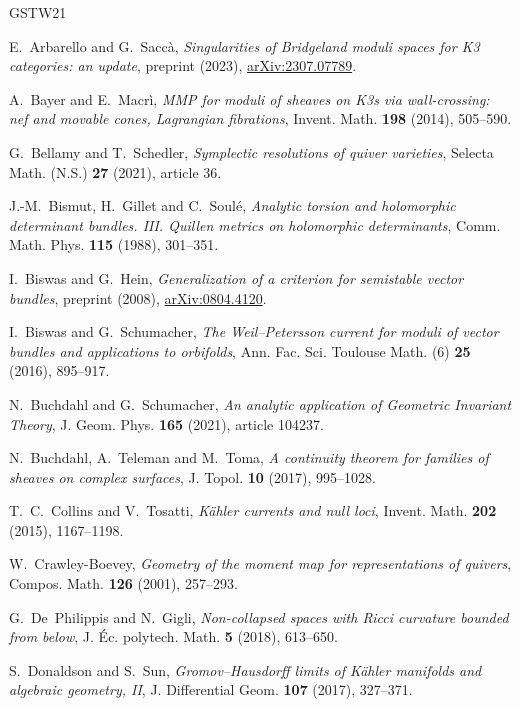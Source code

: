 \begin{thebibliography}{GSTW21}

E.~Arbarello and G.~Sacc\`a,
\emph{Singularities of Bridgeland moduli spaces for K3 categories: an update},
preprint (2023), \href{https://arxiv.org/abs/2307.07789}{arXiv:2307.07789}.

A.~Bayer and E.~Macr\`i,
\emph{MMP for moduli of sheaves on K3s via wall-crossing: nef and movable
cones, Lagrangian fibrations}, Invent. Math. \textbf{198} (2014), 505--590.

G.~Bellamy and T.~Schedler,
\emph{Symplectic resolutions of quiver varieties},
Selecta Math. (N.S.) \textbf{27} (2021), article 36.

J.-M.~Bismut, H.~Gillet and C.~Soul\'e,
\emph{Analytic torsion and holomorphic determinant bundles. III.
Quillen metrics on holomorphic determinants},
Comm. Math. Phys. \textbf{115} (1988), 301--351.

I.~Biswas and G.~Hein,
\emph{Generalization of a criterion for semistable vector bundles},
preprint (2008), \href{https://arxiv.org/abs/0804.4120}{arXiv:0804.4120}.

I.~Biswas and G.~Schumacher,
\emph{The Weil--Petersson current for moduli of vector bundles and
applications to orbifolds}, Ann. Fac. Sci. Toulouse Math. (6)
\textbf{25} (2016), 895--917.

N.~Buchdahl and G.~Schumacher,
\emph{An analytic application of Geometric Invariant Theory},
J. Geom. Phys. \textbf{165} (2021), article 104237.

N.~Buchdahl, A.~Teleman and M.~Toma,
\emph{A continuity theorem for families of sheaves on complex surfaces},
J. Topol. \textbf{10} (2017), 995--1028.

T.~C.~Collins and V.~Tosatti,
\emph{K\"ahler currents and null loci},
Invent. Math. \textbf{202} (2015), 1167--1198.

W.~Crawley-Boevey,
\emph{Geometry of the moment map for representations of quivers},
Compos. Math. \textbf{126} (2001), 257--293.

G.~De~Philippis and N.~Gigli,
\emph{Non-collapsed spaces with Ricci curvature bounded from below},
J. \'Ec. polytech. Math. \textbf{5} (2018), 613--650.

S.~Donaldson and S.~Sun,
\emph{Gromov--Hausdorff limits of K\"ahler manifolds and algebraic geometry, II},
J. Differential Geom. \textbf{107} (2017), 327--371.


\end{thebibliography}
